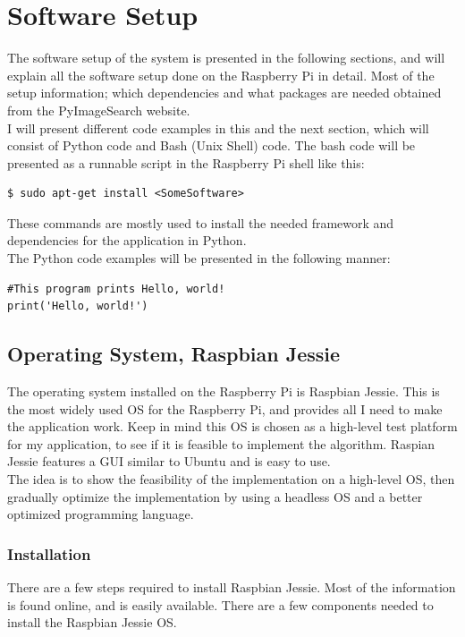 \section{Software Setup}
The software setup of the system is presented in the following sections, and will explain all the software setup done on the Raspberry Pi in detail. Most of the setup information; which dependencies and what packages are needed obtained from the PyImageSearch website\cite{pis}.\\

I will present different code examples in this and the next section, which will consist of Python code and Bash (Unix Shell) code. The bash code will be presented as a runnable script in the Raspberry Pi shell like this:
\begin{verbatim}
$ sudo apt-get install <SomeSoftware>
\end{verbatim}
These commands are mostly used to install the needed framework and dependencies for the application in Python. \\

The Python code examples will be presented in the following manner:
\begin{verbatim}
#This program prints Hello, world!
print('Hello, world!')
\end{verbatim}

\subsection{Operating System, Raspbian Jessie}
The operating system installed on the Raspberry Pi is Raspbian Jessie. This is the most widely used OS for the Raspberry Pi, and provides all I need to make the application work. Keep in mind this OS is chosen as a high-level test platform for my application, to see if it is feasible to implement the algorithm. Raspian Jessie features a GUI similar to Ubuntu and is easy to use.\\

The idea is to show the feasibility of the implementation on a high-level OS, then gradually optimize the implementation by using a headless OS and a better optimized programming language.

\subsubsection{Installation}
There are a few steps required to install Raspbian Jessie. Most of the information is found online, and is easily available. There are a few components needed to install the Raspbian Jessie OS.\\

